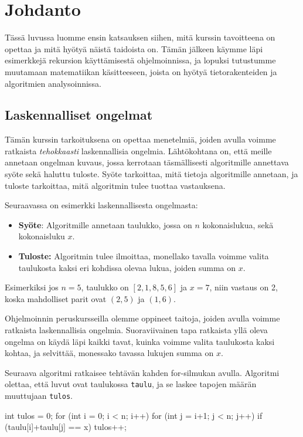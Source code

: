 \chapter{Johdanto}

Tässä luvussa luomme ensin katsauksen siihen, mitä kurssin tavoitteena
on opettaa ja mitä hyötyä näistä taidoista on.
Tämän jälkeen käymme läpi esimerkkejä rekursion käyttämisestä
ohjelmoinnissa, ja lopuksi tutustumme muutamaan matematiikan
käsitteeseen, joista on hyötyä tietorakenteiden ja algoritmien analysoinnissa.

\section{Laskennalliset ongelmat}

Tämän kurssin tarkoituksena on opettaa menetelmiä,
joiden avulla voimme ratkaista \emph{tehokkaasti}
laskennallisia ongelmia.
Lähtökohtana on, että meille annetaan ongelman kuvaus,
jossa kerrotaan täsmällisesti algoritmille annettava
syöte sekä haluttu tuloste.
Syöte tarkoittaa, mitä tietoja algoritmille annetaan,
ja tuloste tarkoittaa, mitä algoritmin tulee tuottaa vastauksena.

Seuraavassa on esimerkki laskennallisesta ongelmasta:

\begin{itemize}
\item \textbf{Syöte}: Algoritmille annetaan taulukko,
jossa on $n$ kokonaislukua, sekä kokonaisluku $x$.
\item \textbf{Tuloste:} Algoritmin tulee ilmoittaa,
monellako tavalla voimme valita taulukosta kaksi eri
kohdissa olevaa lukua, joiden summa on $x$.
\end{itemize}

Esimerkiksi jos $n=5$, taulukko on $[2,1,8,5,6]$ ja $x=7$,
niin vastaus on 2, koska mahdolliset parit ovat
$(2,5)$ ja $(1,6)$.

Ohjelmoinnin peruskursseilla olemme oppineet taitoja,
joiden avulla voimme ratkaista laskennallisia ongelmia.
Suoraviivainen tapa ratkaista yllä oleva ongelma
on käydä läpi kaikki tavat, kuinka voimme valita taulukosta
kaksi kohtaa, ja selvittää, monessako tavassa lukujen summa on $x$.

Seuraava algoritmi ratkaisee tehtävän kahden for-silmukan avulla.
Algoritmi olettaa, että luvut ovat taulukossa \texttt{taulu},
ja se laskee tapojen määrän muuttujaan \texttt{tulos}.

\begin{code}
int tulos = 0;
for (int i = 0; i < n; i++) {
    for (int j = i+1; j < n; j++) {
        if (taulu[i]+taulu[j] == x) {
            tulos++;
        }
    }
}
\end{code}

